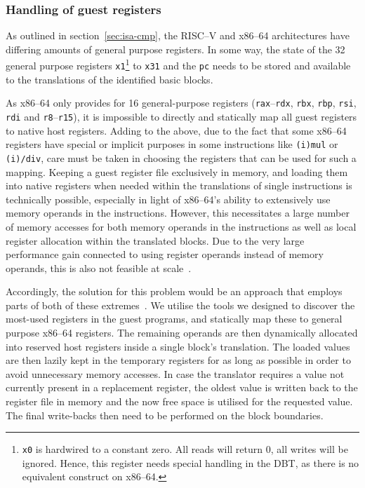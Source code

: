 \subsubsection{Handling of guest registers}
\label{sec:reg-handle}
As outlined in section~\ref{sec:isa-cmp}, the RISC--V and x86--64 architectures have differing amounts of general purpose registers.
In some way, the state of the 32 general purpose registers \texttt{x1}\footnote{\texttt{x0} is hardwired to a constant zero. All reads will return 0, all writes will be ignored. Hence, this register needs special handling in the DBT, as there is no equivalent construct on x86--64.} to \texttt{x31} and the \texttt{pc} needs to be stored and available to the translations of the identified basic blocks.

As x86--64 only provides for 16 general-purpose registers (\texttt{rax}--\texttt{rdx}, \texttt{rbx}, \texttt{rbp}, \texttt{rsi}, \texttt{rdi} and \texttt{r8}--\texttt{r15}), it is impossible to directly and statically map all guest registers to native host registers.
Adding to the above, due to the fact that some x86--64 registers have special or implicit purposes in some instructions like \texttt{(i)mul} or \texttt{(i)/div}, care must be taken in choosing the registers that can be used for such a mapping.
Keeping a guest register file exclusively in memory, and loading them into native registers when needed within the translations of single instructions is technically possible, especially in light of x86--64's ability to extensively use memory operands in the instructions.
However, this necessitates a large number of memory accesses for both memory operands in the instructions as well as local register allocation within the translated blocks.
Due to the very large performance gain connected to using register operands instead of memory operands, this is also not feasible at scale~\cite[S. 8f.]{bintrans}.

Accordingly, the solution for this problem would be an approach that employs parts of both of these extremes~\cite[S. 9]{bintrans}.
We utilise the tools we designed to discover the most-used registers in the guest programs, and statically map these to general purpose x86--64 registers.
The remaining operands are then dynamically allocated into reserved host registers inside a single block's translation.
The loaded values are then lazily kept in the temporary registers for as long as possible in order to avoid unnecessary memory accesses.
In case the translator requires a value not currently present in a replacement register, the oldest value is written back to the register file in memory and the now free space is utilised for the requested value.
The final write-backs then need to be performed on the block boundaries.

